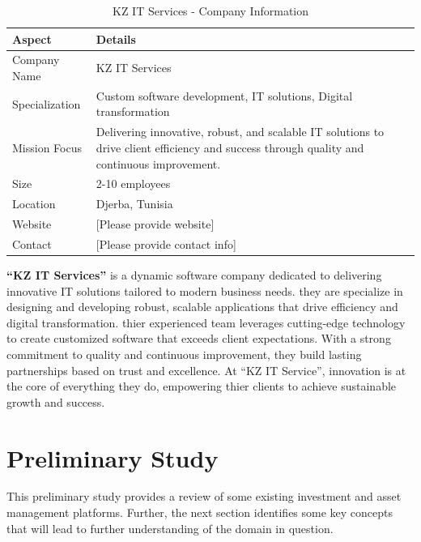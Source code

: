 \newpage
\begin{table}[htbp]
    \centering
    \caption{KZ IT Services - Company Information}
    \label{tab:kz_it_services_info}
    \renewcommand{\arraystretch}{1.3}
    \begin{tabular}{|l|p{}|}
        \hline
        \rowcolor{primary!10}
        \textbf{Aspect} & \textbf{Details} \\
        \hline
        Company Name & KZ IT Services \\
        \hline
        \rowcolor{background!50}
        Specialization & Custom software development, IT solutions, Digital transformation \\
        \hline
        Mission Focus & Delivering innovative, robust, and scalable IT solutions to drive client efficiency and success through quality and continuous improvement. \\
        \hline
        \rowcolor{background!50}
        Size & 2-10 employees \\
        \hline
        \rowcolor{background!50}
        Location & Djerba, Tunisia \\
        \hline
        Website & [Please provide website] \\
        \hline
        \rowcolor{background!50}
        Contact & [Please provide contact info] \\
        \hline
    \end{tabular}
\end{table}

\textbf{\textcolor{primary}{``KZ IT Services''}} is a dynamic software company dedicated to delivering innovative IT solutions tailored to modern business needs. they are specialize in designing and developing robust, scalable applications that drive efficiency and digital transformation. thier experienced team leverages cutting-edge technology to create customized software that exceeds client expectations. With a strong commitment to quality and continuous improvement, they build lasting partnerships based on trust and excellence. At ``KZ IT Service'', innovation is at the core of everything they do, empowering thier clients to achieve sustainable growth and success.

\section{Preliminary Study}

This preliminary study provides a review of some existing investment and asset management platforms. Further, the next section identifies some key concepts that will lead to further understanding of the domain in question.

